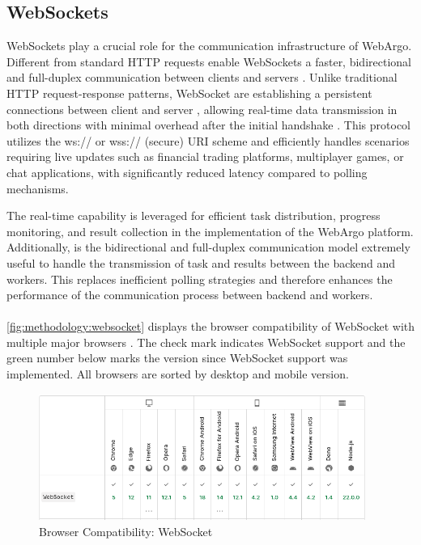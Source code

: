 \subsection{WebSockets}
\label{sec:methodology:websockets}
WebSockets play a crucial role for the communication infrastructure of WebArgo. Different from standard \ac{HTTP} requests enable WebSockets a faster, bidirectional and full-duplex communication between clients and servers \cite{methodology:websockets1, methodology:websockets3, methodology:websockets2}. Unlike traditional \ac{HTTP} request-response patterns, WebSocket are establishing a persistent connections between client and server \cite{methodology:websockets3}, allowing real-time data transmission in both directions with minimal overhead after the initial handshake \cite{methodology:websockets3}. This protocol utilizes the ws:// or wss:// (secure) URI scheme and efficiently handles scenarios requiring live updates such as financial trading platforms, multiplayer games, or chat applications, with significantly reduced latency compared to polling mechanisms.

The real-time capability is leveraged for efficient task distribution, progress monitoring, and result collection in the implementation of the WebArgo platform. Additionally, is the bidirectional and full-duplex communication model extremely useful to handle the transmission of task and results between the backend and workers. This replaces inefficient polling strategies and therefore enhances the performance of the communication process between backend and workers.
\\~\\
\autoref{fig:methodology:websocket} displays the browser compatibility of WebSocket with multiple major browsers \cite{methodology:websockets1}. The check mark indicates WebSocket support and the green number below marks the version since WebSocket support was implemented. All browsers are sorted by desktop and mobile version.
\begin{figure}[htbp]
  \centering
  \includegraphics[width=0.95\textwidth]{gfx/figures/websocket-browsercompability.png}
  \caption{Browser Compatibility: WebSocket \cite{methodology:websockets1}}
  \label{fig:methodology:websocket}
\end{figure}

